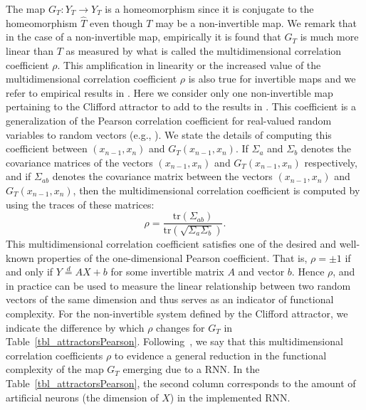 The map $G_T : Y_T \to Y_T$ is a homeomorphism since it is conjugate to the homeomorphism $\widehat{T}$ even though $T$ may be a non-invertible map. We remark that in the case of a non-invertible map, empirically it is found that $G_T$ is much more linear than $T$ as measured by what is called the multidimensional correlation coefficient $\rho$. This amplification in linearity  or the increased value of the multidimensional correlation coefficient $\rho$  is also true for invertible maps and we refer to empirical results in \cite{Supp}. Here we consider only one non-invertible map pertaining to the Clifford attractor to add to the results in \cite{Supp}. This coefficient is a generalization of the Pearson correlation coefficient for real-valued random variables to random vectors (e.g., \cite{puccetti2019measuring}). We state the details of computing this coefficient between 
$(x_{n-1},x_n)$ and $G_T(x_{n-1},x_n)$. 
If $\Sigma_{a}$ and $\Sigma_{b}$ denotes the covariance matrices of the vectors $(x_{n-1},x_n)$ and $G_T(x_{n-1},x_n)$ respectively, and if $\Sigma_{ab}$ denotes the covariance matrix between the vectors $(x_{n-1},x_n)$ and $G_T(x_{n-1},x_n)$, then the multidimensional correlation coefficient is computed by using the traces of these matrices:
\[
    \rho= \frac{\text{tr}({\Sigma_{ab}})}{\text{tr}({\sqrt{\Sigma_a\Sigma_b}})}.
\]
This multidimensional correlation coefficient satisfies one of the desired and well-known properties of the one-dimensional Pearson coefficient. That is, $\rho=\pm 1$ if and only if $Y\overset{d}{=}AX+b$ for some invertible matrix $A$ and vector $b$. Hence $\rho$, and in practice can be used  to measure the linear relationship between two random vectors of the same dimension and thus serves as an indicator of functional complexity. For the non-invertible system defined by the Clifford attractor, we indicate the difference by which $\rho$ changes for $G_T$ in Table~\ref{tbl_attractorsPearson}.
Following~\cite{manjunath2021universal}, we say that this multidimensional correlation coefficients $\rho$ to evidence a general reduction in the functional complexity of the map $G_T$ emerging due to a RNN. In the 
Table~\ref{tbl_attractorsPearson}, the second column corresponds to the amount of artificial neurons (the dimension of $X$) in the implemented RNN.
               
